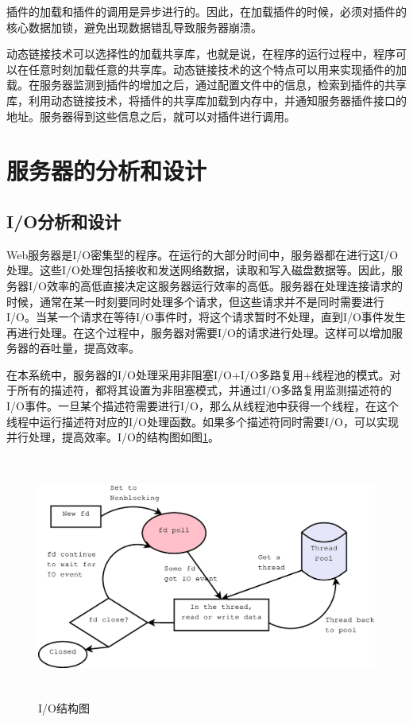 \documentclass[twoside, xetex]{report}
\begin{document}
	插件的加载和插件的调用是异步进行的。因此，在加载插件的时候，必须对插件的核心数据加锁，避免出现数据错乱导致服务器崩溃。
	
	动态链接技术可以选择性的加载共享库，也就是说，在程序的运行过程中，程序可以在任意时刻加载任意的共享库。动态链接技术的这个特点可以用来实现插件的加载。在服务器监测到插件的增加之后，通过配置文件中的信息，检索到插件的共享库，利用动态链接技术，将插件的共享库加载到内存中，并通知服务器插件接口的地址。服务器得到这些信息之后，就可以对插件进行调用。

\section{服务器的分析和设计}
\subsection{I/O分析和设计}
	Web服务器是I/O密集型的程序。在运行的大部分时间中，服务器都在进行这I/O处理。这些I/O处理包括接收和发送网络数据，读取和写入磁盘数据等。因此，服务器I/O效率的高低直接决定这服务器运行效率的高低。服务器在处理连接请求的时候，通常在某一时刻要同时处理多个请求，但这些请求并不是同时需要进行I/O。当某一个请求在等待I/O事件时，将这个请求暂时不处理，直到I/O事件发生再进行处理。在这个过程中，服务器对需要I/O的请求进行处理。这样可以增加服务器的吞吐量，提高效率。
	
	在本系统中，服务器的I/O处理采用非阻塞I/O+I/O多路复用+线程池的模式。对于所有的描述符，都将其设置为非阻塞模式，并通过I/O多路复用监测描述符的I/O事件。一旦某个描述符需要进行I/O，那么从线程池中获得一个线程，在这个线程中运行描述符对应的I/O处理函数。如果多个描述符同时需要I/O，可以实现并行处理，提高效率。I/O的结构图如图\ref{IO}。
	
	\begin{figure}[htbp]
	\centering
	\includegraphics[height=8cm, width=15cm]{pics/IO.eps}
	\caption{I/O结构图}
	\label{IO}
	\end{figure}
	
\end{document}
